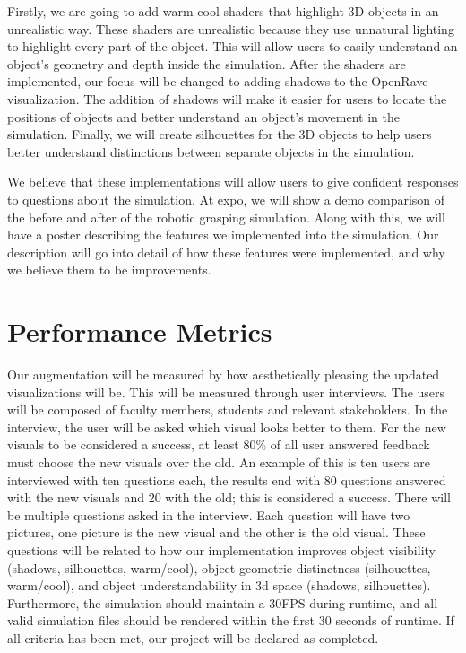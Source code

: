 \documentclass[10pt,journal,compsoc]{IEEEtran}
\begin{document}
Firstly, we are going to add warm cool shaders that highlight 3D objects in an unrealistic way. 
These shaders are unrealistic because they use unnatural lighting to highlight every part of the object. 
This will allow users to easily understand an object's geometry and depth inside the simulation.
After the shaders are implemented, our focus will be changed to adding shadows to the OpenRave visualization. 
The addition of shadows will make it easier for users to locate the positions of objects and better understand an object's movement in the simulation. 
Finally, we will create silhouettes for the 3D objects to help users better understand distinctions between separate objects in the simulation. \par

We believe that these implementations will allow users to give confident responses to questions about the simulation.
At expo, we will show a demo comparison of the before and after of the robotic grasping simulation. 
Along with this, we will have a poster describing the features we implemented into the simulation. 
Our description will go into detail of how these features were implemented, and why we believe them to be improvements.

\section{Performance Metrics}
Our augmentation will be measured by how aesthetically pleasing the updated visualizations will be.
This will be measured through user interviews.
The users will be composed of faculty members, students and relevant stakeholders.
In the interview, the user will be asked which visual looks better to them.
For the new visuals to be considered a success, at least 80\% of all user answered feedback must choose the new visuals over the old. 
An example of this is ten users are interviewed with ten questions each, the results end with 80 questions answered with the new visuals and 20 with the old; this is considered a success.
There will be multiple questions asked in the interview.
Each question will have two pictures, one picture is the new visual and the other is the old visual.
These questions will be related to how our implementation improves object visibility (shadows, silhouettes, warm/cool), object geometric distinctness (silhouettes, warm/cool), and object understandability in 3d space (shadows, silhouettes).
Furthermore, the simulation should maintain a 30FPS during runtime, and all valid simulation files should be rendered within the first 30 seconds of runtime.
If all criteria has been met, our project will be declared as completed.
\end{document}
